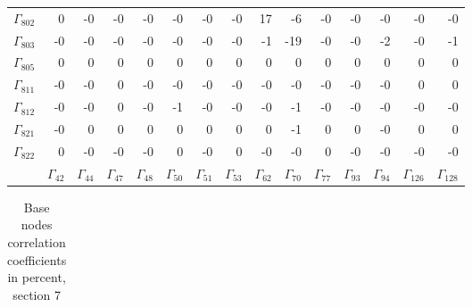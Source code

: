 {\begin{table}
\begin{center}
\begin{minipage}{\linewidth}
\begin{center}
\begin{envsmall}
\begin{center}
\begin{tabular}{rrrrrrrrrrrrrrr}
\( \Gamma_{802} \) &    0 &   -0 &   -0 &   -0 &   -0 &   -0 &   -0 &   17 &   -6 &   -0 &   -0 &   -0 &   -0 &   -0 \\
\( \Gamma_{803} \) &   -0 &   -0 &   -0 &   -0 &   -0 &   -0 &   -0 &   -1 &  -19 &   -0 &   -0 &   -2 &   -0 &   -1 \\
\( \Gamma_{805} \) &    0 &    0 &    0 &    0 &    0 &    0 &    0 &    0 &    0 &    0 &    0 &    0 &    0 &    0 \\
\( \Gamma_{811} \) &   -0 &   -0 &    0 &   -0 &   -0 &   -0 &   -0 &   -0 &   -0 &   -0 &   -0 &   -0 &    0 &    0 \\
\( \Gamma_{812} \) &   -0 &   -0 &    0 &   -0 &   -1 &   -0 &   -0 &   -0 &   -1 &   -0 &   -0 &   -0 &   -0 &   -0 \\
\( \Gamma_{821} \) &   -0 &    0 &    0 &    0 &    0 &    0 &    0 &    0 &   -1 &    0 &    0 &   -0 &    0 &    0 \\
\( \Gamma_{822} \) &    0 &   -0 &   -0 &   -0 &    0 &   -0 &    0 &   -0 &   -0 &    0 &   -0 &   -0 &   -0 &   -0 \\
 & \( \Gamma_{42} \) & \( \Gamma_{44} \) & \( \Gamma_{47} \) & \( \Gamma_{48} \) & \( \Gamma_{50} \) & \( \Gamma_{51} \) & \( \Gamma_{53} \) & \( \Gamma_{62} \) & \( \Gamma_{70} \) & \( \Gamma_{77} \) & \( \Gamma_{93} \) & \( \Gamma_{94} \) & \( \Gamma_{126} \) & \( \Gamma_{128} \)
\\\hline
\end{tabular}
\end{center}
\end{envsmall}
\ifhevea\else
\end{center}
\end{minipage}
\fi
\end{center}
\ifhevea\end{table}\fi
\ifhevea\begin{table}\fi%
\begin{center}
\ifhevea
\caption{Base nodes correlation coefficients in percent, section 7\label{tab:tau:br-fit-corr7}}%
\else
\begin{minipage}{\linewidth}
\begin{center}
\label{tab:tau:br-fit-corr7}%
\fi
\begin{envsmall}
\begin{center}
\renewcommand*{\arraystretch}{1.1}%
\begin{tabular}{rrrrrrrrrrrrrrr}

\end{tabular}
\end{center}
\end{envsmall}
\end{center}
\end{minipage}
\end{center}
\end{table}}
